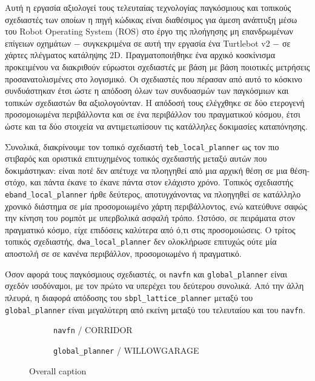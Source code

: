 



Αυτή η εργασία αξιολογεί τους τελευταίας τεχνολογίας παγκόσμιους και τοπικούς σχεδιαστές των οποίων η πηγή
κώδικας είναι διαθέσιμος για άμεση ανάπτυξη μέσω του Robot Operating System (ROS)
στο έργο της πλοήγησης μη επανδρωμένων επίγειων οχημάτων $-$ συγκεκριμένα σε
αυτή την εργασία ένα Turtlebot v2 $-$ σε χάρτες πλέγματος κατάληψης $2$D.
Πραγματοποιήθηκε ένα αρχικό κοσκίνισμα προκειμένου να διακριθούν εύρωστοι σχεδιαστές με βάση
με βάση ποιοτικές μετρήσεις προσανατολισμένες στο λογισμικό. Οι σχεδιαστές που πέρασαν από
αυτό το κόσκινο συνδυάστηκαν έτσι ώστε η απόδοση όλων των συνδυασμών των
παγκόσμιων και τοπικών σχεδιαστών θα αξιολογούνταν. Η απόδοσή τους ελέγχθηκε
σε δύο ετερογενή προσομοιωμένα περιβάλλοντα και σε ένα περιβάλλον του πραγματικού κόσμου,
έτσι ώστε και τα δύο στοιχεία να αντιμετωπίσουν τις κατάλληλες δοκιμασίες καταπόνησης.

Συνολικά, διακρίνουμε τον τοπικό σχεδιαστή \texttt{teb\_local\_planner} ως τον πιο
στιβαρός και οριστικά επιτυχημένος τοπικός σχεδιαστής μεταξύ αυτών που δοκιμάστηκαν: είναι
ποτέ δεν απέτυχε να πλοηγηθεί από μια αρχική θέση σε μια θέση-στόχο, και πάντα έκανε
το έκανε πάντα στον ελάχιστο χρόνο. Τοπικός σχεδιαστής \texttt{eband\_local\_planner}
ήρθε δεύτερος, αποτυγχάνοντας να πλοηγηθεί σε κατάλληλο χρονικό διάστημα σε μία
προσομοιωμένο χάρτη περιβάλλοντος, ενώ κατεύθυνε σαφώς την κίνηση του ρομπότ
με υπερβολικά ασφαλή τρόπο. Ωστόσο, σε πειράματα στον πραγματικό κόσμο, είχε επιδόσεις
καλύτερα από ό,τι στις προσομοιώσεις. Ο τρίτος τοπικός σχεδιαστής,
\texttt{dwa\_local\_planner} δεν ολοκλήρωσε επιτυχώς ούτε μία αποστολή σε
σε κανένα περιβάλλον, προσομοιωμένο ή πραγματικό.

Όσον αφορά τους παγκόσμιους σχεδιαστές, οι \texttt{navfn} και \texttt{global\_planner}
είναι σχεδόν ισοδύναμοι, με τον πρώτο να υπερέχει του δεύτερου συνολικά.
Από την άλλη πλευρά, η διαφορά απόδοσης του \texttt{sbpl\_lattice\_planner}
μεταξύ του \texttt{global\_planner} είναι μεγαλύτερη από εκείνη μεταξύ του τελευταίου
και του \texttt{navfn}.





\begin{figure}[t]\vspace{1cm}\centering
   \begin{subfigure}{0.49\linewidth}\centering
     
     \vspace{0.75cm}
     \caption{\small \texttt{navfn} / CORRIDOR}\label{fig:figA}
   \end{subfigure}
   \begin{subfigure}{0.49\linewidth} \centering
     
     \vspace{0.75cm}
     \caption{\small \texttt{global\_planner} / WILLOWGARAGE}\label{fig:figB}
   \end{subfigure}
\caption{Overall caption} \label{fig:twofigs}
\end{figure}
